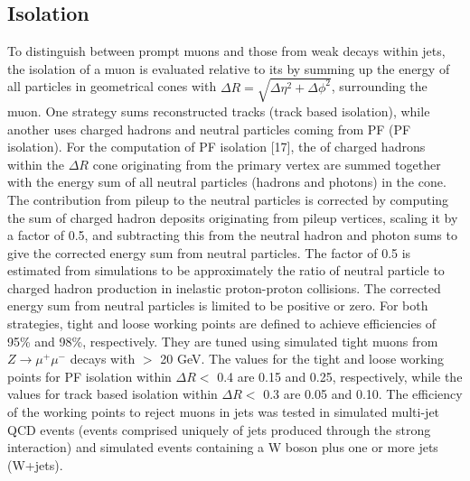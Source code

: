 \subsection{Isolation}
To distinguish between prompt muons and those from weak decays within jets, the isolation of a muon is evaluated  relative  to  its \pt by  summing  up  the  energy  of all particles in  geometrical  cones with $\Delta R = \sqrt{\Delta\eta^2+\Delta\phi^2}$, surrounding the muon. One strategy sums reconstructed tracks (track based isolation), while another uses charged hadrons and neutral particles coming from PF (PF isolation). For the computation of PF isolation [17], the \pt of charged hadrons within the $\Delta R$ cone originating from the primary vertex are summed together with the energy sum of all neutral particles (hadrons and photons) in the cone.   The contribution from pileup to the neutral particles is corrected by computing the sum of charged hadron deposits originating from pileup vertices, scaling it by a factor of 0.5,  and subtracting this from the neutral hadron and photon sums to give the corrected energy sum from neutral particles.  The factor of 0.5 is estimated from simulations to be approximately the ratio of neutral particle to charged hadron production in inelastic proton-proton collisions.  The corrected energy sum from neutral particles is limited to be positive or zero. For both strategies, tight and loose working points are defined to achieve efficiencies of 95\% and 98\%, respectively.  They are tuned using simulated tight muons from $Z\to\mu^+\mu^-$ decays with \pt $>$ 20 GeV.  The values for the tight and loose working points for PF isolation within $\Delta R<$ 0.4 are 0.15 and 0.25, respectively, while the values for track based isolation within $\Delta R <$ 0.3 are 0.05 and 0.10.  The efficiency of the working points to reject muons in jets was tested in simulated multi-jet QCD events (events comprised uniquely of jets produced through the strong interaction) and simulated events containing a W boson plus one or more jets (W+jets).

